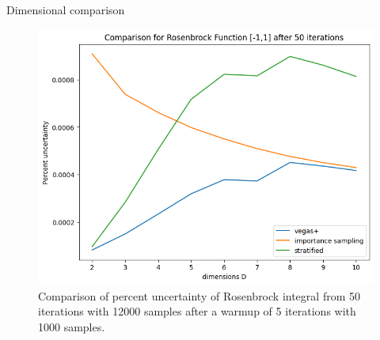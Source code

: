 \documentclass[t,handout,professionalfonts]{beamer}
\begin{document}
\begin{frame}{Dimensional comparison}
	\vspace{-0.5cm}
	\tiny
		\begin{figure}
				\includegraphics[width=height=4cm,width=6cm]{../plots/rosen_dims_final.png}
				\caption{Comparison of  percent uncertainty of Rosenbrock integral  from 50 iterations with 12000 samples after a warmup of 5 iterations with 1000 samples.}
	\end{figure}
		
\end{frame}
\end{document}
